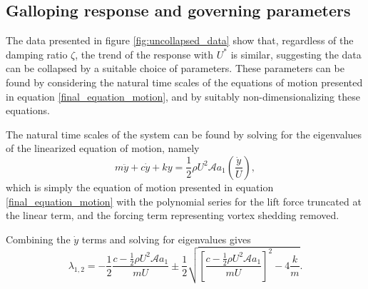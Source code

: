 \subsection{Galloping response and governing parameters}
 
 
The data presented in figure \ref{fig:uncollapsed_data} show that, regardless of the damping ratio $\zeta$, the trend of the response with $U^*$ is similar, suggesting the data can be collapsed by a suitable choice of parameters. These parameters can be found by considering the natural time scales of the equations of motion presented in equation \ref{final_equation_motion}, and by suitably non-dimensionalizing these equations.

The natural time scales of the system can be found by solving for the eigenvalues of the linearized equation of motion, namely
\begin{equation}
\label{eqn:eom_linear}
m\ddot{y}{+}c\dot{y}{+}ky{=}\frac{1}{2}\rho U^2 \mathcal{A} a_1\left(\frac{\dot{y}}{U}\right),
\end{equation}
which is simply the equation of motion presented in equation \ref{final_equation_motion} with the polynomial series for the lift force truncated at the linear term, and the forcing term representing vortex shedding removed.

Combining the $\dot{y}$ terms and solving for eigenvalues gives
\begin{equation}
  \label{eqn:eigs}
  \lambda_{1,2}= -\frac{1}{2}\frac{c-\frac{1}{2}\rho U^2\mathcal{A}a_1}{mU}\pm\frac{1}{2}\sqrt{\left[\frac{c-\frac{1}{2}\rho U^2\mathcal{A}a_1}{mU}\right]^2-4\frac{k}{m}}.
\end{equation}

